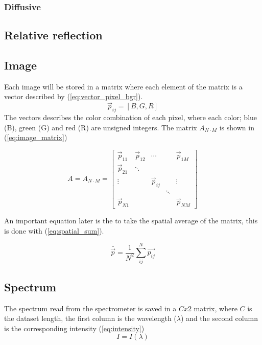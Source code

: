 \documentclass{article}
\newcommand*\mean[1]{\bar{#1}}
\begin{document}
\subsubsection{Diffusive}
\subsection{Relative reflection}


\subsection{Image}
Each image will be stored in a matrix where each element of the matrix is a vector described by (\ref{eq:vector_pixel_bgr}).
\begin{equation}
    \label{eq:vector_pixel_bgr}
    \vec{p}_{ij} = [B,G,R]
\end{equation} 
The vectors describes the color combination of each pixel, where each color; blue (B), green (G) and red (R) are unsigned integers. The matrix $A_{N\cdot M}$ is shown in (\ref{eq:image_matrix})

\begin{equation}
    \label{eq:image_matrix}
    A = A_{N\cdot M} =  
    \begin{bmatrix}
        \vec{p}_{11} & \vec{p}_{12} & \cdots & & \vec{p}_{1M}  \\
        \vec{p}_{21} & \ddots &        &       &                \\
        \vdots       &        &\vec{p}_{ij}&   & \vdots          \\
                     &        &        & \ddots&                  \\
        \vec{p}_{N1} &        &        &       & \vec{p}_{NM}  
    \end{bmatrix}
\end{equation}

An important equation later is the to take the spatial average of the matrix, this is done with (\ref{eq:spatial_sum}).

\begin{equation}
    \label{eq:spatial_sum}
    \mean{\vec{p}} = \frac{1}{N^2} \sum_{ij}^N \vec{p_{ij}}
\end{equation}


\subsection{Spectrum}
\label{sec:spectrum}

The spectrum read from the spectrometer is saved in a $C x 2$ matrix, where $C$ is the dataset length, the first column is the wavelength ($\lambda$) and the second column is the corresponding intensity (\ref{eq:intensity})
\begin{equation}
    \label{eq:intensity}
    I = I(\lambda)    
\end{equation}
\end{document}

